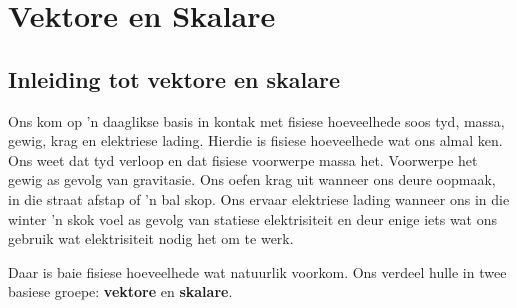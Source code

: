          \chapter{Vektore en Skalare}\label{chap:vectors}
    \setcounter{figure}{1}
    \setcounter{subfigure}{1}
    \label{59e414b70efc194a27a122db47d06ce6}
         \section{Inleiding tot vektore en skalare}
    \nopagebreak
Ons kom op  'n daaglikse basis in kontak met fisiese hoeveelhede soos tyd, massa, gewig, krag en elektriese lading. Hierdie is fisiese hoeveelhede wat ons almal ken. Ons weet dat tyd verloop en dat fisiese voorwerpe massa het. Voorwerpe het gewig as gevolg van gravitasie. Ons oefen krag uit wanneer ons deure oopmaak, in die straat afstap of  'n bal skop. Ons ervaar elektriese lading wanneer ons in die winter  'n skok voel as gevolg van statiese elektrisiteit en deur enige iets wat ons gebruik wat elektrisiteit nodig het om te werk.

Daar is baie fisiese hoeveelhede wat natuurlik voorkom. Ons verdeel hulle in twee basiese groepe: \textbf{vektore} en \textbf{skalare}.\\

